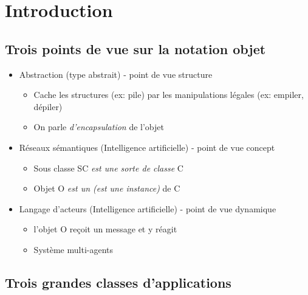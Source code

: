 \documentclass{article}
\begin{document}
\section{Introduction}

\subsection{Trois points de vue sur la notation objet}

\begin{itemize}
	\item Abstraction (type abstrait) - point de vue structure
		\begin{itemize}
			\item Cache les structures (ex: pile) par les manipulations légales (ex: empiler,
dépiler)
			\item On parle \emph{d'encapsulation} de l'objet
		\end{itemize}
	\item Réseaux sémantiques (Intelligence artificielle) - point de vue concept
	\begin{itemize}
		\item Sous classe SC \emph{est une sorte de classe} C
		\item Objet O \emph{est un (est une instance)} de C
	\end{itemize}
	\item Langage d'acteurs (Intelligence artificielle) - point de vue dynamique
	\begin{itemize}
		\item l'objet O reçoit un message et y réagit
		\item Système multi-agents
	\end{itemize}
\end{itemize}

\subsection{Trois grandes classes d'applications}
\end{document}
